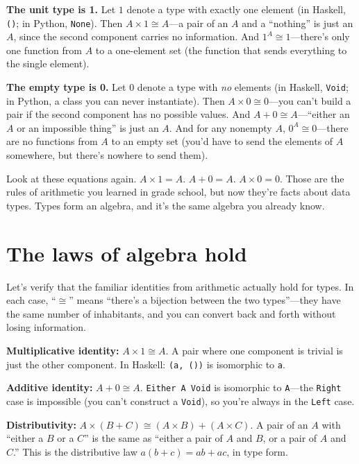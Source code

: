 \documentclass[11pt]{article}
\begin{document}
\medskip
\noindent\textbf{The unit type is 1.} Let $1$ denote a type with exactly one element (in Haskell, \texttt{()};  in Python, \texttt{None}). Then $A \times 1 \cong A$---a pair of an $A$ and a ``nothing'' is just an $A$, since the second component carries no information. And $1^A \cong 1$---there's only one function from $A$ to a one-element set (the function that sends everything to the single element).

\medskip
\noindent\textbf{The empty type is 0.} Let $0$ denote a type with \emph{no} elements (in Haskell, \texttt{Void}; in Python, a class you can never instantiate). Then $A \times 0 \cong 0$---you can't build a pair if the second component has no possible values. And $A + 0 \cong A$---``either an $A$ or an impossible thing'' is just an $A$. And for any nonempty $A$, $0^A \cong 0$---there are no functions from $A$ to an empty set (you'd have to send the elements of $A$ somewhere, but there's nowhere to send them).

\medskip
Look at these equations again. $A \times 1 = A$. $A + 0 = A$. $A \times 0 = 0$. Those are the rules of arithmetic you learned in grade school, but now they're facts about data types. Types form an algebra, and it's the same algebra you already know.

\section{The laws of algebra hold}

Let's verify that the familiar identities from arithmetic actually hold for types. In each case, ``$\cong$'' means ``there's a bijection between the two types''---they have the same number of inhabitants, and you can convert back and forth without losing information.

\medskip
\noindent\textbf{Multiplicative identity:} $A \times 1 \cong A$. A pair where one component is trivial is just the other component. In Haskell: \texttt{(a, ())} is isomorphic to \texttt{a}.

\medskip
\noindent\textbf{Additive identity:} $A + 0 \cong A$. \texttt{Either A Void} is isomorphic to \texttt{A}---the \texttt{Right} case is impossible (you can't construct a \texttt{Void}), so you're always in the \texttt{Left} case.

\medskip
\noindent\textbf{Distributivity:} $A \times (B + C) \cong (A \times B) + (A \times C)$. A pair of an $A$ with ``either a $B$ or a $C$'' is the same as ``either a pair of $A$ and $B$, or a pair of $A$ and $C$.'' This is the distributive law $a(b + c) = ab + ac$, in type form.
\end{document}
